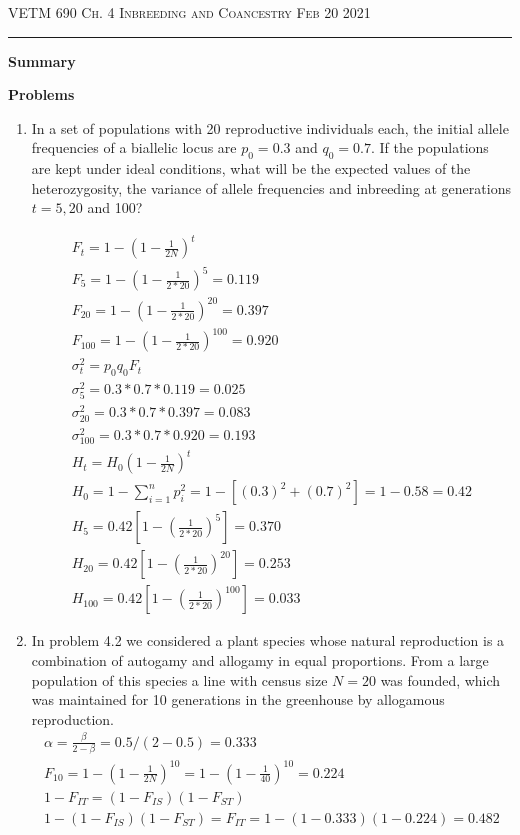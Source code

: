 \documentclass[12pt]{amsart}
\begin{document}
\thispagestyle{empty}
{\scshape VETM 690} \hfill {\scshape \Large  Ch. 4 Inbreeding and Coancestry} \hfill {\scshape Feb 20 2021}
 
\medskip

\hrule

\bigskip

\bigskip

{\large \bf Summary}

{\large \bf Problems}   
\begin{enumerate}
\item In a set of populations with 20 reproductive individuals each, the initial allele frequencies of a biallelic locus are $p_0 = 0.3$ and $q_0 = 0.7$. If the populations are kept under ideal conditions, what will be the expected values of the heterozygosity, the variance of allele frequencies and inbreeding at generations $t = 5, 20$ and 100?

\begin{gather*}
F_t = 1 - (1 - \frac{1}{2N})^t \\
F_5 = 1 - (1 - \frac{1}{2*20}) ^ 5 =  0.119\\
F_{20} = 1 - (1 - \frac{1}{2*20}) ^ {20} = 0.397\\  
F_{100} = 1 - (1 - \frac{1}{2*20}) ^ {100} = 0.920\\
\sigma _t^2 = p_0q_0F_t \\
\sigma_5^2 = 0.3 * 0.7 * 0.119 = 0.025\\
\sigma_{20}^2 = 0.3 * 0.7 * 0.397 = 0.083\\
\sigma_{100}^2 = 0.3 * 0.7 * 0.920 = 0.193\\
H_t = H_0(1 - \frac{1}{2N})^t \\
H_0 = 1 - \sum_{i=1}^np_i^2 = 1 - [(0.3)^2 + (0.7)^2] = 1 - 0.58 = 0.42 \\
H_5 = 0.42[1 - (\frac{1}{2*20})^5] = 0.370\\
H_{20} = 0.42[1 - (\frac{1}{2*20})^{20}] = 0.253\\
H_{100} = 0.42[1 - (\frac{1}{2*20})^{100}] = 0.033
\end{gather*}

\item In problem 4.2 we considered a plant species whose natural reproduction is a combination of autogamy and allogamy in equal proportions. From a large population of this species a line with census size $N = 20$ was founded, which was maintained for 10 generations in the greenhouse by allogamous reproduction. 
\begin{gather*}
\alpha = \frac{\beta}{2-\beta} = 0.5/(2 - 0.5) = 0.333 \\
F_{10} = 1 - (1 - \frac{1}{2N})^{10} = 1 - (1 - \frac{1}{40})^{10} = 0.224 \\
1 - F_{IT} = (1 - F_{IS})(1-F_{ST}) \\
1 - (1 - F_{IS})(1 - F_{ST}) = F_{IT} = 1 - (1 - 0.333)(1 - 0.224) = 0.482
\end{gather*}


\end{enumerate}
\end{document}
